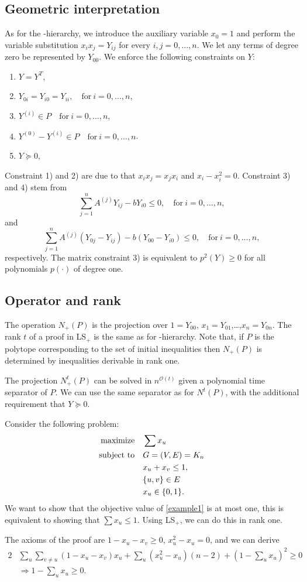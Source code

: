 \documentclass[a4paper,twoside,justified]{tufte-handout}
\begin{document}
\subsection{Geometric interpretation}
As for the \Lovasz-\Schrijver hierarchy, we introduce the auxiliary variable $x_0=1$ and perform the variable substitution $x_ix_j=Y_{ij}$ for every $i,j=0,\ldots,n$. We let any terms of degree zero be represented by $Y_{00}$. We enforce the following constraints on $Y$:
\begin{enumerate}
\item $Y=Y^T$,
\item $Y_{0i}=Y_{i0}=Y_{ii}, \quad\text{for}\ i=0,\ldots,n$,
\item $Y^{(i)}\in P \quad\text{for}\ i=0,\ldots,n$,
\item $Y^{(0)}-Y^{(i)}\in P \quad\text{for}\ i=0,\ldots,n$.
\item $Y\succeq0$,
\end{enumerate}
Constraint 1) and 2) are due to that $x_ix_j=x_jx_i$ and $x_i-x_i^2=0$. Constraint 3) and 4) stem from 
\[\sum_{j=1}^{n} A^{(j)}Y_{ij}-bY_{i0}\leq 0, \quad\text{for}\ i=0,\ldots,n,\]
and 
\[\sum_{j=1}^{n} A^{(j)}(Y_{0j}-Y_{ij})-b(Y_{00}-Y_{i0})\leq 0, \quad\text{for}\ i=0,\ldots,n,\]
respectively. The matrix constraint 3) is equivalent to $p^2(Y)\geq0$ for all polynomials $p(\cdot)$ of degree one.

\subsection{Operator and rank}
The operation $N_+(P)$ is the projection over $1=Y_{00}$, $x_1=Y_{01}$,\ldots,$x_n=Y_{0n}$. The rank $t$ of a proof in LS$_+$ is the same as for \Lovasz-\Schrijver hierarchy. Note that, if $P$ is the polytope corresponding to the set of initial inequalities then $N_+(P)$ is determined by inequalities derivable in rank one. 

The projection $N_+^t(P)$ can be solved in $n^{\mathcal{O}(t)}$ given a polynomial time separator of $P$. We can use the same separator as for $N^t(P)$, with the additional requirement that $Y\succeq0$.

\begin{example}
Consider the following problem:
\begin{alignat}{2}
\label{example1}
  \text{maximize}\hspace{1em}& \sum x_u\notag \\
  \text{subject to}\hspace{1em}& G=(V,E)=K_n\notag \\
  & x_u+x_v\leq 1,\notag \\
&\{u,v\}\in E\notag\\
&x_u\in\{0,1\}.
\end{alignat}
We want to show that the objective value of \eqref{example1} is at most one, this is equivalent to showing that $\sum x_u\leq 1$. Using LS$_+$, we can do this in rank one.

The axioms of the proof are $1-x_u-x_v\geq 0$, $x_u^2-x_u=0$, and we can derive
\begin{alignat*}{2}
&\sum_u\sum_{v\neq u}(1-x_u-x_v)x_u+\sum_u(x_u^2-x_u)(n-2)+(1-\sum_ux_u)^2\geq0\\
&\Rightarrow1-\sum_ux_u\geq0.
\end{alignat*}
\end{example}
\end{document}
